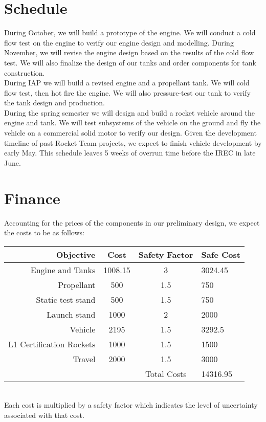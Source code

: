 \documentclass{article}
\begin{document}
\section*{Schedule}
During October, we will build a prototype of the engine. We will conduct a cold flow test on the engine to verify our engine design and modelling.
During November, we will revise the engine design based on the results of the cold flow test. We will also finalize the design of our tanks and order components for tank construction.\\
During IAP we will build a revised engine and a propellant tank. We will cold flow test, then hot fire the engine. We will also pressure-test our tank to verify the tank design and production.\\
During the spring semester we will design and build a rocket vehicle around the engine and tank. We will test subsystems of the vehicle on the ground and fly the vehicle on a commercial solid motor to verify our design. Given the development timeline of past Rocket Team projects, we expect to finish vehicle development by early May. This schedule leaves 5 weeks of overrun time before the IREC in late June.


\section*{Finance}
Accounting for the prices of the components in our preliminary design, we expect the costs to be as follows:\\
\begin{tabular}{r | c | c || l}
Objective & Cost & Safety Factor & Safe Cost \\
\hline
Engine and Tanks & 1008.15 & 3 & 3024.45 \\
Propellant & 500 & 1.5 & 750 \\
Static test stand & 500 & 1.5 & 750 \\
Launch stand & 1000 & 2 & 2000 \\
Vehicle & 2195 & 1.5 & 3292.5 \\
L1 Certification Rockets & 1000 & 1.5 & 1500 \\
Travel & 2000 & 1.5 & 3000 \\
\hline
 & & Total Costs & 14316.95 \\
\end{tabular}
\\Each cost is multiplied by a safety factor which indicates the level of uncertainty associated with that cost.
\end{document}
